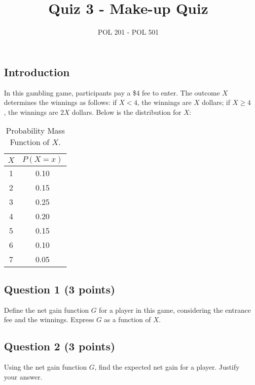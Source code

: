 \documentclass{article}
\title{Quiz 3 - Make-up Quiz}
\author{POL 201 - POL 501}
\date{}
\begin{document}
\maketitle

\subsection*{Introduction}
In this gambling game, participants pay a \$4 fee to enter. The outcome \(X\) determines the winnings as follows: if \(X < 4\), the winnings are \(X\) dollars; if \(X \geq 4\), the winnings are \(2X\) dollars. Below is the distribution for \(X\):

\begin{table}[h!]
\centering
\begin{tabular}{c|c}
    \hline
    \(X\) & \(P(X = x)\) \\
    \hline
    1 & 0.10 \\
    2 & 0.15 \\
    3 & 0.25 \\
    4 & 0.20 \\
    5 & 0.15 \\
    6 & 0.10 \\
    7 & 0.05 \\
    \hline
\end{tabular}
\caption{Probability Mass Function of \(X\).}
\end{table}

\subsection*{Question 1 (3 points)}
Define the net gain function \(G\) for a player in this game, considering the entrance fee and the winnings. Express \(G\) as a function of \(X\).

\begin{center}
\end{center}

\subsection*{Question 2 (3 points)}
Using the net gain function \(G\), find the expected net gain for a player. Justify your answer.

\begin{center}
\end{center}
\end{document}
